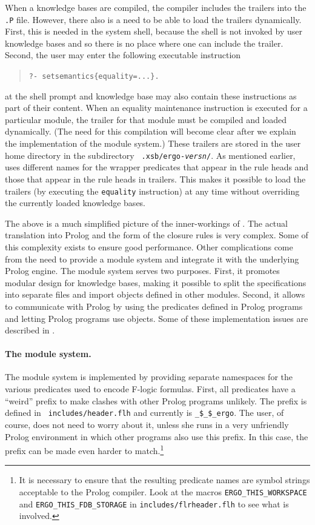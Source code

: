 \documentclass[11pt]{article}
\newcommand{\ERGO}{\mbox{\smaller{\ensuremath{\cal{E}}\smaller{{\sc{RGO}}}}}\xspace}
\newcommand{\FLSYSTEM}{\ERGO}
\newcommand{\fl}{\mbox{F-logic}\xspace}
\begin{document}
When a \FLSYSTEM knowledge bases are compiled, the compiler includes the trailers into
the {\tt .P} file. However, there also is a need to be able to load the
trailers dynamically. First, this is needed in the system shell, because
the shell is not invoked by user knowledge bases and so there is
no place where one can include the trailer. Second, the user may enter the
following executable instruction 
\begin{quote}
   {\tt ?- setsemantics\{equality=...\}. }
\end{quote}
at the shell prompt and knowledge base may also contain these instructions as
part of their content.  When an equality maintenance instruction is executed
for a particular module, the trailer for that module must be compiled and
loaded dynamically.  (The need for this compilation will become clear after
we explain the implementation of the module system.)  These trailers are
stored in the user home directory in the subdirectory {\tt
  .xsb/ergo-\emph{versn}/}.
As mentioned earlier, \FLSYSTEM uses different names for the wrapper predicates
that appear in the rule heads and those that appear in the
rule heads in trailers. This makes it possible to load the trailers (by
executing the {\tt equality} instruction) at any time without overriding
the currently loaded knowledge bases.

The above is a much simplified picture of the inner-workings of \FLSYSTEM. The
actual translation into Prolog and the form of the closure rules is very
complex.  Some of this complexity exists to ensure good performance.  Other
complications come from the need to provide a module system and integrate
it with the underlying Prolog engine.  The module system serves two
purposes.  First, it promotes modular design for \FLSYSTEM knowledge bases, making it
possible to split the specifications into separate files and import objects defined
in other modules. Second, it allows \FLSYSTEM to communicate with
Prolog by using the predicates defined in Prolog programs and letting
Prolog programs use \FLSYSTEM objects.  Some of these implementation issues
are described in \cite{guiz-flora-00}.

\paragraph{The module system.} The module system is implemented by
providing separate namespaces for the various predicates used to encode \fl
formulas. First, all predicates have a ``weird'' prefix to make clashes with
other Prolog programs unlikely. The prefix is defined in {\tt
  includes/header.flh} and currently is {\tt \_\$\_\$\_ergo}. The user, of
course, does not need to worry about it, unless she runs \FLSYSTEM in
a very unfriendly Prolog environment in which other programs also use this
prefix. In this case, the prefix can be made
even harder to match.\footnote{
  It is necessary to ensure that the resulting predicate names are symbol
  strings acceptable to the Prolog compiler. Look at the macros
  {\tt ERGO\_THIS\_WORKSPACE} and {\tt ERGO\_THIS\_FDB\_STORAGE} in
  {\tt includes/flrheader.flh} to see what is involved.
  }
\end{document}
